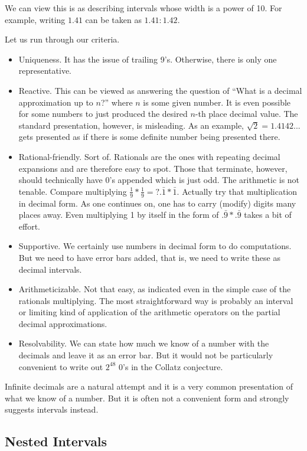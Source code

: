 \documentclass[12pt]{article}
\theoremstyle{remark}
\begin{document}
We can view this is as describing intervals whose width is a power of 10. For example, writing $1.41$ can be taken as $1.41:1.42$. 

Let us run through our criteria. 

\begin{itemize}
    \item Uniqueness. It has the issue of trailing 9's. Otherwise, there is only one representative. 
    \item Reactive. This can be viewed as answering the question of ``What is a decimal approximation up to $n$?'' where $n$ is some given number. It is even possible for some numbers to just produced the desired $n$-th place decimal value. The standard presentation, however, is misleading. As an example, $\sqrt{2} = 1.4142...$ gets presented as if there is some definite number being presented there. 
    \item Rational-friendly. Sort of. Rationals are the ones with repeating decimal expansions and are therefore easy to spot. Those that terminate, however, should technically have 0's appended which is just odd. The arithmetic is not tenable. Compare multiplying $\tfrac{1}{9}*\tfrac{1}{9} =? .\bar{1} * \bar{1}$. Actually try that multiplication in decimal form. As one continues on, one has to carry (modify) digits many places away. Even multiplying 1 by itself in the form of $.\bar{9}*.\bar{9}$ takes a bit of effort. 
    \item Supportive. We certainly use numbers in decimal form to do computations. But we need to have error bars added, that is, we need to write these as decimal intervals. 
    \item Arithmeticizable. Not that easy, as indicated even in the simple case of the rationals multiplying. The most straightforward way is probably an interval or limiting kind of application of the arithmetic operators on the partial decimal approximations. 
    \item Resolvability. We can state how much we know of a number with the decimals and leave it as an error bar. But it would not be particularly convenient to write out $2^48$ 0's in the Collatz conjecture. 
\end{itemize}

Infinite decimals are a natural attempt and it is a very common presentation of what we know of a number. But it is often not a convenient form and strongly suggests intervals instead. 

\subsection{Nested Intervals}
\end{document}
